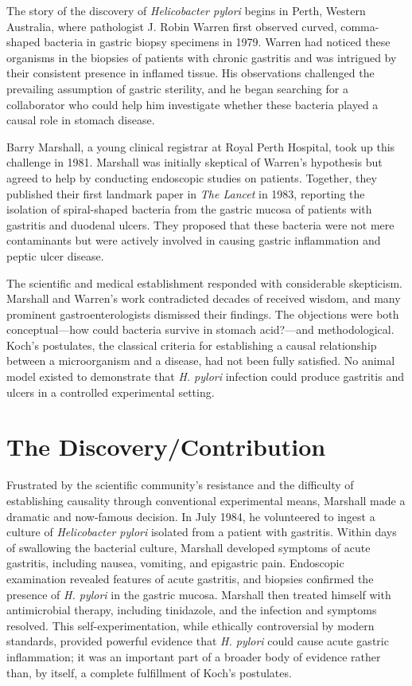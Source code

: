 The story of the discovery of \textit{Helicobacter pylori} begins in Perth, Western Australia, where pathologist J. Robin Warren first observed curved, comma-shaped bacteria in gastric biopsy specimens in 1979. Warren had noticed these organisms in the biopsies of patients with chronic gastritis and was intrigued by their consistent presence in inflamed tissue. His observations challenged the prevailing assumption of gastric sterility, and he began searching for a collaborator who could help him investigate whether these bacteria played a causal role in stomach disease.

Barry Marshall, a young clinical registrar at Royal Perth Hospital, took up this challenge in 1981. Marshall was initially skeptical of Warren's hypothesis but agreed to help by conducting endoscopic studies on patients. Together, they published their first landmark paper in \textit{The Lancet} in 1983, reporting the isolation of spiral-shaped bacteria from the gastric mucosa of patients with gastritis and duodenal ulcers. They proposed that these bacteria were not mere contaminants but were actively involved in causing gastric inflammation and peptic ulcer disease.

The scientific and medical establishment responded with considerable skepticism. Marshall and Warren's work contradicted decades of received wisdom, and many prominent gastroenterologists dismissed their findings. The objections were both conceptual---how could bacteria survive in stomach acid?---and methodological. Koch's postulates, the classical criteria for establishing a causal relationship between a microorganism and a disease, had not been fully satisfied. No animal model existed to demonstrate that \textit{H. pylori} infection could produce gastritis and ulcers in a controlled experimental setting.

\section{The Discovery/Contribution}

Frustrated by the scientific community's resistance and the difficulty of establishing causality through conventional experimental means, Marshall made a dramatic and now-famous decision. In July 1984, he volunteered to ingest a culture of \textit{Helicobacter pylori} isolated from a patient with gastritis. Within days of swallowing the bacterial culture, Marshall developed symptoms of acute gastritis, including nausea, vomiting, and epigastric pain. Endoscopic examination revealed features of acute gastritis, and biopsies confirmed the presence of \textit{H. pylori} in the gastric mucosa. Marshall then treated himself with antimicrobial therapy, including tinidazole, and the infection and symptoms resolved. This self-experimentation, while ethically controversial by modern standards, provided powerful evidence that \textit{H. pylori} could cause acute gastric inflammation; it was an important part of a broader body of evidence rather than, by itself, a complete fulfillment of Koch's postulates.

